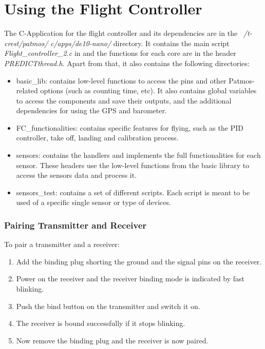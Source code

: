 \section*{Using the Flight Controller}\label{app:sec_fc}

The C-Application for the flight controller and its dependencies are in the \textit{~/t-crest/patmos/} \textit{c/apps/de10-nano/} directory. It contains the main script \textit{Flight\_controller\_2.c} in and the functions for each core are in the header \textit{PREDICTthread.h}. Apart from that, it also contains the following directories:

\begin{itemize}
    \item basic\_lib: contains low-level functions to access the pins and other Patmos-related options (such as counting time, etc). It also contains global variables to access the components and save their outputs, and the additional dependencies for using the GPS and barometer.
    \item FC\_functionalities: contains specific features for flying, such as the PID controller, take off, landing and calibration process.
    \item sensors: contains the handlers and implements the full functionalities for each sensor. These headers use the low-level functions from the basic library to access the sensors data and process it.
    \item sensors\_test: contains a set of different scripts. Each script is meant to be used of a specific single sensor or type of devices.
\end{itemize}
\subsubsection*{Pairing Transmitter and Receiver}\label{trans_receiver_pair}
To pair a transmitter and a receiver:
\begin{enumerate}
    \item Add the binding plug shorting the ground and the signal pins on the receiver.
    \item Power on the receiver and the receiver binding mode is indicated by fast blinking.
    \item Push the bind button on the transmitter and switch it on.
    \item The receiver is bound successfully if it stops blinking.
    \item Now remove the binding plug and the receiver is now paired.
\end{enumerate}

